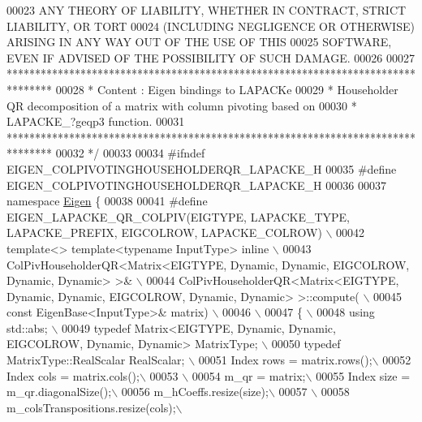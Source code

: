 \begin{DoxyCode}
00023 \textcolor{comment}{ ANY THEORY OF LIABILITY, WHETHER IN CONTRACT, STRICT LIABILITY, OR TORT}
00024 \textcolor{comment}{ (INCLUDING NEGLIGENCE OR OTHERWISE) ARISING IN ANY WAY OUT OF THE USE OF THIS}
00025 \textcolor{comment}{ SOFTWARE, EVEN IF ADVISED OF THE POSSIBILITY OF SUCH DAMAGE.}
00026 \textcolor{comment}{}
00027 \textcolor{comment}{ ********************************************************************************}
00028 \textcolor{comment}{ *   Content : Eigen bindings to LAPACKe}
00029 \textcolor{comment}{ *    Householder QR decomposition of a matrix with column pivoting based on}
00030 \textcolor{comment}{ *    LAPACKE\_?geqp3 function.}
00031 \textcolor{comment}{ ********************************************************************************}
00032 \textcolor{comment}{*/}
00033 
00034 \textcolor{preprocessor}{#ifndef EIGEN\_COLPIVOTINGHOUSEHOLDERQR\_LAPACKE\_H}
00035 \textcolor{preprocessor}{#define EIGEN\_COLPIVOTINGHOUSEHOLDERQR\_LAPACKE\_H}
00036 
00037 \textcolor{keyword}{namespace }\hyperlink{namespace_eigen}{Eigen} \{ 
00038 
00041 \textcolor{preprocessor}{#define EIGEN\_LAPACKE\_QR\_COLPIV(EIGTYPE, LAPACKE\_TYPE, LAPACKE\_PREFIX, EIGCOLROW, LAPACKE\_COLROW) \(\backslash\)}
00042 \textcolor{preprocessor}{template<> template<typename InputType> inline \(\backslash\)}
00043 \textcolor{preprocessor}{ColPivHouseholderQR<Matrix<EIGTYPE, Dynamic, Dynamic, EIGCOLROW, Dynamic, Dynamic> >& \(\backslash\)}
00044 \textcolor{preprocessor}{ColPivHouseholderQR<Matrix<EIGTYPE, Dynamic, Dynamic, EIGCOLROW, Dynamic, Dynamic> >::compute( \(\backslash\)}
00045 \textcolor{preprocessor}{              const EigenBase<InputType>& matrix) \(\backslash\)}
00046 \textcolor{preprocessor}{\(\backslash\)}
00047 \textcolor{preprocessor}{\{ \(\backslash\)}
00048 \textcolor{preprocessor}{  using std::abs; \(\backslash\)}
00049 \textcolor{preprocessor}{  typedef Matrix<EIGTYPE, Dynamic, Dynamic, EIGCOLROW, Dynamic, Dynamic> MatrixType; \(\backslash\)}
00050 \textcolor{preprocessor}{  typedef MatrixType::RealScalar RealScalar; \(\backslash\)}
00051 \textcolor{preprocessor}{  Index rows = matrix.rows();\(\backslash\)}
00052 \textcolor{preprocessor}{  Index cols = matrix.cols();\(\backslash\)}
00053 \textcolor{preprocessor}{\(\backslash\)}
00054 \textcolor{preprocessor}{  m\_qr = matrix;\(\backslash\)}
00055 \textcolor{preprocessor}{  Index size = m\_qr.diagonalSize();\(\backslash\)}
00056 \textcolor{preprocessor}{  m\_hCoeffs.resize(size);\(\backslash\)}
00057 \textcolor{preprocessor}{\(\backslash\)}
00058 \textcolor{preprocessor}{  m\_colsTranspositions.resize(cols);\(\backslash\)}

\end{DoxyCode}
